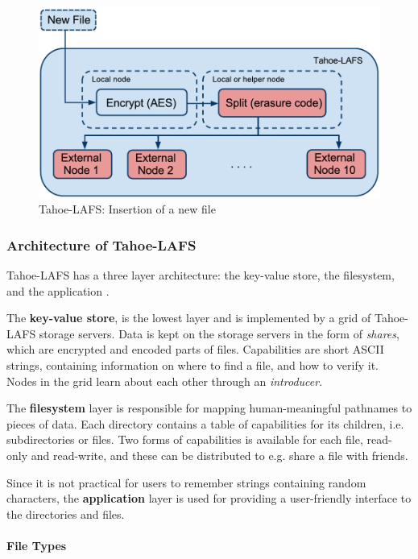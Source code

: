 \documentclass[pdftex,english,10pt,b5paper,twoside]{book}
\begin{document}
\begin{figure}[h!]
    \centering
    \includegraphics[width=\columnwidth]{Tahoe-newfile.pdf}
    \caption{Tahoe-LAFS: Insertion of a new file}
    \label{fig:B:tahoe}
\end{figure}


\subsubsection{Architecture of Tahoe-LAFS}

Tahoe-\ac{LAFS} has a three layer architecture: the key-value store, the filesystem, and
the application \cite{tahoe}.

The \textbf{key-value store}, is the lowest layer and is implemented by a grid
of Tahoe-LAFS storage servers. Data is kept on the storage servers in the form
of \emph{shares}, which are encrypted and encoded parts of files. Capabilities
are short ASCII strings, containing information on where to find a file, and
how to verify it.  Nodes in the grid learn about each other through an
\emph{introducer}.

The \textbf{filesystem} layer is responsible for mapping human-meaningful
pathnames to pieces of data. Each directory contains a table of capabilities
for its children, i.e. subdirectories or files. Two forms of capabilities is
available for each file, read-only and read-write, and these can be distributed
to e.g. share a file with friends.

Since it is not practical for users to remember strings containing random
characters, the \textbf{application} layer is used for providing a user-friendly
interface to the directories and files.

\paragraph{File Types}
\end{document}
